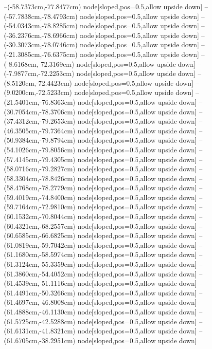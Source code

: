 --(-58.7373cm,-77.8477cm) node[sloped,pos=0.5,allow upside down]{\ArrowIn}
--(-57.7838cm,-78.4793cm) node[sloped,pos=0.5,allow upside down]{\ArrowIn}
--(-54.0343cm,-78.8285cm) node[sloped,pos=0.5,allow upside down]{\ArrowIn}
--(-36.2376cm,-78.6966cm) node[sloped,pos=0.5,allow upside down]{\ArrowIn}
--(-30.3073cm,-78.0746cm) node[sloped,pos=0.5,allow upside down]{\ArrowIn}
--(-21.3085cm,-76.6375cm) node[sloped,pos=0.5,allow upside down]{\ArrowIn}
--(-8.6168cm,-72.3169cm) node[sloped,pos=0.5,allow upside down]{\ArrowIn}
--(-7.9877cm,-72.2253cm) node[sloped,pos=0.5,allow upside down]{\arrowIn}
--(8.5120cm,-72.4423cm) node[sloped,pos=0.5,allow upside down]{\ArrowIn}
--(9.0200cm,-72.5233cm) node[sloped,pos=0.5,allow upside down]{\arrowIn}
--(21.5401cm,-76.8363cm) node[sloped,pos=0.5,allow upside down]{\ArrowIn}
--(30.7054cm,-78.3706cm) node[sloped,pos=0.5,allow upside down]{\ArrowIn}
--(37.4312cm,-79.2653cm) node[sloped,pos=0.5,allow upside down]{\ArrowIn}
--(46.3505cm,-79.7364cm) node[sloped,pos=0.5,allow upside down]{\ArrowIn}
--(50.9384cm,-79.8794cm) node[sloped,pos=0.5,allow upside down]{\ArrowIn}
--(54.1026cm,-79.8056cm) node[sloped,pos=0.5,allow upside down]{\ArrowIn}
--(57.4145cm,-79.4305cm) node[sloped,pos=0.5,allow upside down]{\ArrowIn}
--(58.0716cm,-79.2827cm) node[sloped,pos=0.5,allow upside down]{\arrowIn}
--(58.3304cm,-78.8426cm) node[sloped,pos=0.5,allow upside down]{\arrowIn}
--(58.4768cm,-78.2779cm) node[sloped,pos=0.5,allow upside down]{\arrowIn}
--(59.4019cm,-74.8400cm) node[sloped,pos=0.5,allow upside down]{\ArrowIn}
--(59.7164cm,-72.9810cm) node[sloped,pos=0.5,allow upside down]{\ArrowIn}
--(60.1532cm,-70.8044cm) node[sloped,pos=0.5,allow upside down]{\ArrowIn}
--(60.4321cm,-68.2557cm) node[sloped,pos=0.5,allow upside down]{\ArrowIn}
--(60.6585cm,-66.6825cm) node[sloped,pos=0.5,allow upside down]{\ArrowIn}
--(61.0819cm,-59.7042cm) node[sloped,pos=0.5,allow upside down]{\ArrowIn}
--(61.1680cm,-58.5974cm) node[sloped,pos=0.5,allow upside down]{\ArrowIn}
--(61.3124cm,-55.3359cm) node[sloped,pos=0.5,allow upside down]{\ArrowIn}
--(61.3860cm,-54.4052cm) node[sloped,pos=0.5,allow upside down]{\arrowIn}
--(61.4539cm,-51.1116cm) node[sloped,pos=0.5,allow upside down]{\ArrowIn}
--(61.4491cm,-50.3266cm) node[sloped,pos=0.5,allow upside down]{\arrowIn}
--(61.4697cm,-46.8008cm) node[sloped,pos=0.5,allow upside down]{\ArrowIn}
--(61.4888cm,-46.1130cm) node[sloped,pos=0.5,allow upside down]{\arrowIn}
--(61.5725cm,-42.5288cm) node[sloped,pos=0.5,allow upside down]{\ArrowIn}
--(61.6131cm,-41.8321cm) node[sloped,pos=0.5,allow upside down]{\arrowIn}
--(61.6705cm,-38.2951cm) node[sloped,pos=0.5,allow upside down]{\ArrowIn}

